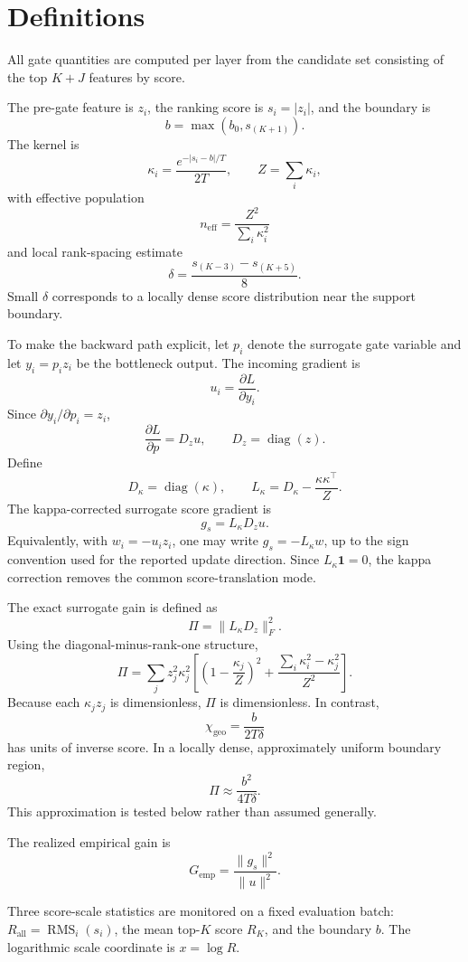 \documentclass[11pt,a4paper]{article}
\newcommand{\neff}{n_{\mathrm{eff}}}
\newcommand{\chigeo}{\chi_{\mathrm{geo}}}
\newcommand{\Pisurr}{\Pi}
\begin{document}
\section{Definitions}

All gate quantities are computed per layer from the candidate set consisting of the top \(K+J\) features by score.

The pre-gate feature is \(z_i\), the ranking score is \(s_i=|z_i|\), and the boundary is
\[
b=\max(b_0,s_{(K+1)}).
\]
The kernel is
\[
\kappa_i=\frac{e^{-|s_i-b|/T}}{2T},\qquad Z=\sum_i\kappa_i,
\]
with effective population
\[
\neff=\frac{Z^2}{\sum_i\kappa_i^2}
\]
and local rank-spacing estimate
\[
\delta=\frac{s_{(K-3)}-s_{(K+5)}}{8}.
\]
Small \(\delta\) corresponds to a locally dense score distribution near the support boundary.

To make the backward path explicit, let \(p_i\) denote the surrogate gate variable and let \(y_i=p_i z_i\) be the bottleneck output. The incoming gradient is
\[
u_i=\frac{\partial L}{\partial y_i}.
\]
Since \(\partial y_i/\partial p_i=z_i\),
\[
\frac{\partial L}{\partial p}=D_z u,\qquad D_z=\operatorname{diag}(z).
\]
Define
\[
D_\kappa=\operatorname{diag}(\kappa),\qquad
L_\kappa=D_\kappa-\frac{\kappa\kappa^\top}{Z}.
\]
The kappa-corrected surrogate score gradient is
\[
g_s=L_\kappa D_z u.
\]
Equivalently, with \(w_i=-u_i z_i\), one may write \(g_s=-L_\kappa w\), up to the sign convention used for the reported update direction. Since \(L_\kappa\mathbf 1=0\), the kappa correction removes the common score-translation mode.

The exact surrogate gain is defined as
\[
\boxed{\Pisurr=\|L_\kappa D_z\|_F^2.}
\]
Using the diagonal-minus-rank-one structure,
\[
\Pisurr=
\sum_j z_j^2\kappa_j^2
\left[
\left(1-\frac{\kappa_j}{Z}\right)^2+
\frac{\sum_i\kappa_i^2-\kappa_j^2}{Z^2}
\right].
\]
Because each \(\kappa_j z_j\) is dimensionless, \(\Pisurr\) is dimensionless. In contrast,
\[
\chigeo=\frac{b}{2T\delta}
\]
has units of inverse score. In a locally dense, approximately uniform boundary region,
\[
\Pisurr\approx\frac{b^2}{4T\delta}.
\]
This approximation is tested below rather than assumed generally.

The realized empirical gain is
\[
G_{\mathrm{emp}}=\frac{\|g_s\|^2}{\|u\|^2}.
\]

Three score-scale statistics are monitored on a fixed evaluation batch: \(R_{\mathrm{all}}=\operatorname{RMS}_i(s_i)\), the mean top-\(K\) score \(R_K\), and the boundary \(b\). The logarithmic scale coordinate is \(x=\log R\).
\end{document}
